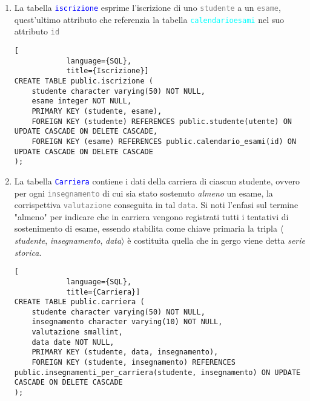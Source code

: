 \documentclass{article}
\newcommand{\tabb}[1]{\texttt{\textcolor{blue}{#1}}}
\newcommand{\tab}[1]{\texttt{\textcolor{cyan}{#1}}}
\newcommand{\attr}[1]{\texttt{\textcolor{gray}{#1}}}
\newcommand{\und}[0]{\textunderscore}
\begin{document}
\begin{enumerate}
\begin{itemize}
        \end{itemize}
        \begin{lstlisting}[
            language={SQL},
            title={Calendario Esami}]
CREATE TABLE public.calendario_esami (
    insegnamento character varying(10) NOT NULL,
    data date NOT NULL,
    ora time without time zone NOT NULL,
    id serial PRIMARY KEY,
    FOREIGN KEY (insegnamento) REFERENCES public.insegnamento(codice) ON UPDATE CASCADE ON DELETE CASCADE
);
        \end{lstlisting}

        \item La tabella \tabb{iscrizione} esprime l'iscrizione di uno \attr{studente} a un \attr{esame}, quest'ultimo attributo che referenzia la tabella \tab{calendario\und esami} nel suo attributo \attr{id}
        \begin{lstlisting}[
            language={SQL},
            title={Iscrizione}]
CREATE TABLE public.iscrizione (
    studente character varying(50) NOT NULL,
    esame integer NOT NULL,
    PRIMARY KEY (studente, esame),
    FOREIGN KEY (studente) REFERENCES public.studente(utente) ON UPDATE CASCADE ON DELETE CASCADE,
    FOREIGN KEY (esame) REFERENCES public.calendario_esami(id) ON UPDATE CASCADE ON DELETE CASCADE
);
        \end{lstlisting}

        \item La tabella \tabb{Carriera} contiene i dati della carriera di ciascun studente, ovvero per ogni \attr{insegnamento} di cui sia stato sostenuto \textit{almeno} un esame, la corrispettiva \attr{valutazione} conseguita in tal \attr{data}. Si noti l'enfasi sul termine "almeno" per indicare che in carriera vengono registrati tutti i tentativi di sostenimento di esame, essendo stabilita come chiave primaria la tripla $\langle$\textit{studente}, \textit{insegnamento}, \textit{data}$\rangle$ è costituita quella che in gergo viene detta \textit{serie storica}.
        \begin{lstlisting}[
            language={SQL},
            title={Carriera}]
CREATE TABLE public.carriera (
    studente character varying(50) NOT NULL,
    insegnamento character varying(10) NOT NULL,
    valutazione smallint,
    data date NOT NULL,
    PRIMARY KEY (studente, data, insegnamento),
    FOREIGN KEY (studente, insegnamento) REFERENCES public.insegnamenti_per_carriera(studente, insegnamento) ON UPDATE CASCADE ON DELETE CASCADE
);
        \end{lstlisting}


\end{enumerate}
\end{document}
